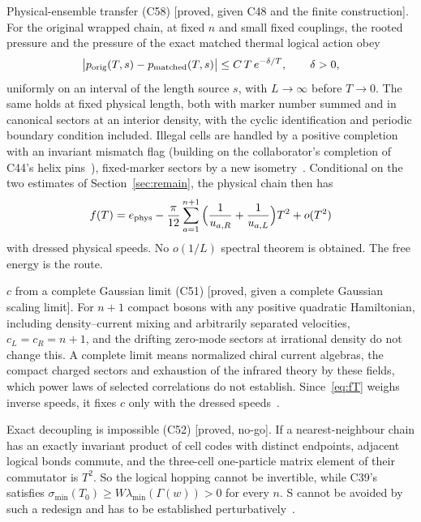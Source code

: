 \documentclass[11pt]{article}
\theoremstyle{definition}
\newcommand{\st}[1]{\textup{[\textsf{#1}]}}
\begin{document}
Physical-ensemble transfer (C58) \st{proved, given C48 and the finite construction}. For the original wrapped chain, at fixed $n$ and small fixed couplings, the rooted pressure and the pressure of the exact matched thermal logical action obey
\begin{align}
\big|p_{\rm orig}(T,s)-p_{\rm matched}(T,s)\big|\le C\,T\,e^{-\delta/T},\qquad\delta>0,
\label{eq:C58}
\end{align}
uniformly on an interval of the length source $s$, with $L\to\infty$ before $T\to0$. The same holds at fixed physical length, both with marker number summed and in canonical sectors at an interior density, with the cyclic identification and periodic boundary condition included. Illegal cells are handled by a positive completion with an invariant mismatch flag (building on the collaborator's completion of C44's helix pins~\cite{thermal}), fixed-marker sectors by a new isometry~\cite[PROOF \S\S3, 8, 9]{C58}. Conditional on the two estimates of Section~\ref{sec:remain}, the physical chain then has
\begin{align}
f(T)=e_{\rm phys}-\frac{\pi}{12}\sum_{a=1}^{n+1}\Big(\frac{1}{u_{a,R}}+\frac{1}{u_{a,L}}\Big)T^2+o(T^2)
\label{eq:fT}
\end{align}
with dressed physical speeds. No $o(1/L)$ spectral theorem is obtained. The free energy is the route.

$c$ from a complete Gaussian limit (C51) \st{proved, given a complete Gaussian scaling limit}. For $n+1$ compact bosons with any positive quadratic Hamiltonian, including density--current mixing and arbitrarily separated velocities, $c_L=c_R=n+1$, and the drifting zero-mode sectors at irrational density do not change this. A complete limit means normalized chiral current algebras, the compact charged sectors and exhaustion of the infrared theory by these fields, which power laws of selected correlations do not establish. Since~\eqref{eq:fT} weighs inverse speeds, it fixes $c$ only with the dressed speeds~\cite{C51}.

Exact decoupling is impossible (C52) \st{proved, no-go}. If a nearest-neighbour chain has an exactly invariant product of cell codes with distinct endpoints, adjacent logical bonds commute, and the three-cell one-particle matrix element of their commutator is $T^2$. So the logical hopping cannot be invertible, while C39's satisfies $\sigma_{\min}(T_0)\ge W\lambda_{\min}(\Gamma(w))>0$ for every $n$. S cannot be avoided by such a redesign and has to be established perturbatively~\cite{C52}.
\end{document}
